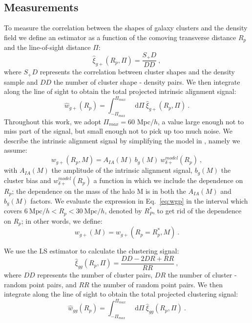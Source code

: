 \documentclass[a4paper,fleqn,usenatbib]{mnras}
\newcommand*\dif{\mathop{}\!\mathrm{d}} 	%
\begin{document}
\subsection{Measurements}
\label{subsec:measurements}
To measure the correlation between the shapes of galaxy clusters and the density field we define an estimator as a function of the comoving transverse distance $R_p$ and the line-of-sight distance $\Pi$:
\begin{equation}
    \hat{\xi}_{g+}(R_p, \Pi) = \frac{S_+ D}{D D} \ ,
	\label{eq:xigphat}
\end{equation}
where $S_+ D$ represents the correlation between cluster shapes and the density sample and $D D$ the number of cluster shape - density pairs. We then integrate along the line of sight to obtain the total projected intrinsic alignment signal:
\begin{equation}
   \hat{w}_{g+} (R_p) = \int _{-\Pi_{max}}^{\Pi_{max}} \dif \Pi \ \hat{\xi}_{g+}(R_p, \Pi) \ .
	\label{eq:wgphat}
\end{equation}
Throughout this work, we adopt $\Pi_{max} = 60 $ Mpc$/h$, a value large enough not to miss part of the signal, but small enough not to pick up too much noise. 
We describe the intrinsic alignment signal by simplifying the model in \citet[equation 5]{vanUitertJoachimi2017}, namely we assume:
\begin{equation}
    w_{g+} (R_p, M)=A_{IA} (M) \ b_g (M)\ w_{\delta +}^{model} (R_p) \ , 
	\label{eq:wgp}
\end{equation}
with $A_{IA} (M)$ the amplitude of the intrinsic alignment signal, $b_g (M)$ the cluster bias and $w_{\delta +}^{model} (R_p)$ a function in which we include the dependence on $R_p$; the dependence on the mass of the halo M is in both the $A_{IA} (M)$ and $b_g (M)$ factors. We evaluate the expression in Eq.~\ref{eq:wgp} in the interval which covers $6 \ \mbox{Mpc}/h < R_p < 30 \ \mbox{Mpc}/h$, denoted by $R_P^*$, to get rid of the dependence on $R_p$; in other words, we define:
\begin{equation}
    w_{g+} (M)= w_{g+} (R_p = R_p^*, M) \ .
	\label{eq:wgpmass}
\end{equation}

We use the LS \citep{LandySzalay1993} estimator to calculate the clustering signal:
\begin{equation}
    \hat{\xi}_{gg}(R_p, \Pi) = \frac{DD -2DR + RR}{RR} \ ,
	\label{eq:xigghat}
\end{equation}
where $DD$ represents the number of cluster pairs, $DR$ the number of cluster - random point pairs, and $RR$ the number of random point pairs. We then integrate along the line of sight to obtain the total projected clustering signal:
\begin{equation}
   \hat{w}_{gg} (R_p) = \int _{-\Pi_{max}}^{\Pi_{max}} \dif \Pi \ \hat{\xi}_{gg}(R_p, \Pi) \ .
	\label{eq:wgghat}
\end{equation}
\end{document}

